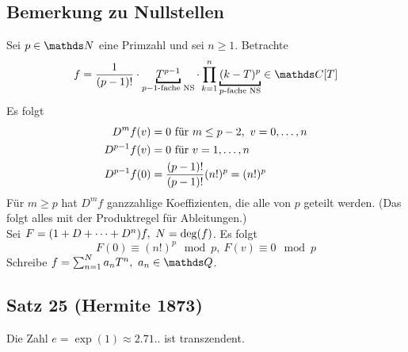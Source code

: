 \subsection{Bemerkung zu Nullstellen}
\label{sub:bemerkung_nullstellen}
Sei $p\in \N$ eine Primzahl und sei $n\ge 1$.
Betrachte
\[
f=\frac{1}{(p-1)!}\cdot \underbracket{T^{p-1}}_{p-1\text{-fache NS}}\cdot  \prod_{k=1}^{n}\underbracket{(k-T)^p}_{p\text{-fache NS}}\in \C[T]
\]
Es folgt
\begin{equation*}
\begin{aligned}
	D^mf(v) &= 0\text{ für }m\le p-2,~v=0, \dots ,n\\
	D^{p-1}f(v) &= 0\text{ für } v=1, \dots ,n\\
	D^{p-1}f(0) &= \frac{(p-1)!}{(p-1)!}(n!)^p=(n!)^p
\end{aligned}
\end{equation*}
Für $m\ge p$ hat $D^mf$ ganzzahlige Koeffizienten, die alle von $p$ geteilt werden.
(Das folgt alles mit der Produktregel für Ableitungen.)\\
Sei $F=(1+D+ \dots +D^n)f,~N=\deg(f)$.
Es folgt 
\[
F(0)\equiv (n!)^p \mod{p},~ F(v)\equiv 0 \mod{p}
\]
Schreibe $f=\sum_{n=1}^N a_nT^n,~a_n\in \Q$.

\subsection{Satz 25 (Hermite 1873)}
\label{sub:satz_25}
Die Zahl $e=\exp(1)\approx 2.71..$ ist transzendent.\\


